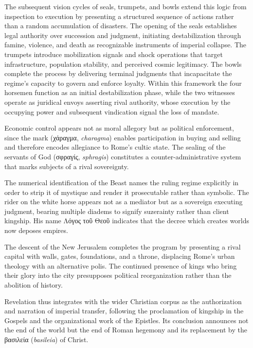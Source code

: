 The subsequent vision cycles of seals, trumpets, and bowls extend this logic from inspection to execution by presenting a structured sequence of actions rather than a random accumulation of disasters.
The opening of the seals establishes legal authority over succession and judgment, initiating destabilization through famine, violence, and death as recognizable instruments of imperial collapse.
The trumpets introduce mobilization signals and shock operations that target infrastructure, population stability, and perceived cosmic legitimacy.
The bowls complete the process by delivering terminal judgments that incapacitate the regime's capacity to govern and enforce loyalty.
Within this framework the four horsemen function as an initial destabilization phase, while the two witnesses operate as juridical envoys asserting rival authority, whose execution by the occupying power and subsequent vindication signal the loss of mandate.

Economic control appears not as moral allegory but as political enforcement, since the mark (χάραγμα, \emph{charagma}) enables participation in buying and selling and therefore encodes allegiance to Rome's cultic state.
The sealing of the servants of God (σφραγίς, \emph{sphragis}) constitutes a counter-administrative system that marks subjects of a rival sovereignty.

The numerical identification of the Beast names the ruling regime explicitly in order to strip it of mystique and render it prosecutable rather than symbolic.
The rider on the white horse appears not as a mediator but as a sovereign executing judgment, bearing multiple diadems to signify suzerainty rather than client kingship.
His name Λόγος τοῦ Θεοῦ indicates that the decree which creates worlds now deposes empires.

The descent of the New Jerusalem completes the program by presenting a rival capital with walls, gates, foundations, and a throne, displacing Rome's urban theology with an alternative polis.
The continued presence of kings who bring their glory into the city presupposes political reorganization rather than the abolition of history.

Revelation thus integrates with the wider Christian corpus as the authorization and narration of imperial transfer, following the proclamation of kingship in the Gospels and the organizational work of the Epistles.
Its conclusion announces not the end of the world but the end of Roman hegemony and its replacement by the βασιλεία (\emph{basileia}) of Christ.
